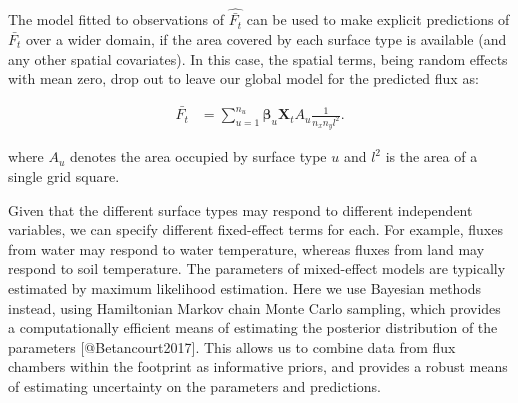 The model fitted to observations of $\widehat{\bar{F_t}}$ can be used to make explicit predictions of $\bar{F_t}$ over a wider domain, if the area covered by each surface type is available (and any other spatial covariates). In this case, the spatial terms, being random effects with mean zero, drop out to leave our global model for the predicted flux as:

\begin{align}   \label{eq:pred_Fbar}
  \bar{F_t} &= \sum_{u = 1}^{n_u} \boldsymbol{\beta}_u \mathbf{X}_t A_{u} \frac{1}{n_x n_y l^2}.
\end{align}

where $A_{u}$ denotes the area occupied by surface type $u$ and $l^2$ is the area of a single grid square.



Given that the different surface types may respond to different independent variables, we can specify different fixed-effect terms for each.  For example, fluxes from water may respond to water temperature, whereas fluxes from land may respond to soil temperature. The parameters of mixed-effect models are typically estimated by maximum likelihood estimation. Here we use Bayesian methods instead, using Hamiltonian Markov chain Monte Carlo sampling, which provides a computationally efficient means of estimating the posterior distribution of the parameters [@Betancourt2017]. This allows us to combine data from flux chambers within the footprint as informative priors, and provides a robust means of estimating uncertainty on the parameters and predictions.

